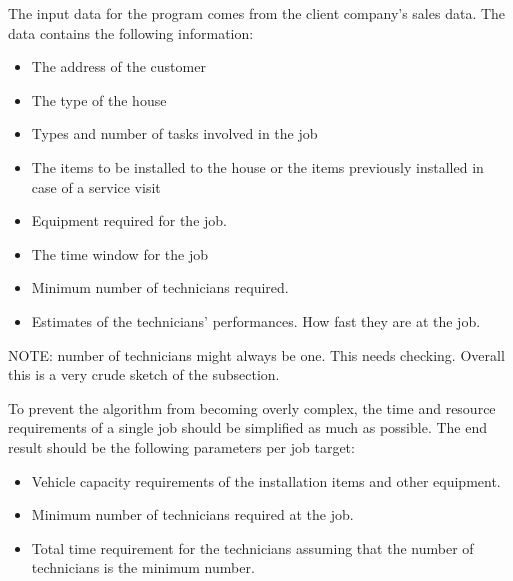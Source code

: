 The input data for the program comes from the client company's sales data. The data contains the following information:

\begin{itemize}
\item The address of the customer
\item The type of the house
\item Types and number of tasks involved in the job 
\item The items to be installed to the house or the items previously installed in case of a service visit
\item Equipment required for the job.
\item The time window for the job
\item Minimum number of technicians required.
\item Estimates of the technicians' performances. How fast they are at the job.
\end{itemize}

NOTE: number of technicians might always be one. This needs checking. Overall this is a very crude sketch of the subsection. 

To prevent the algorithm from becoming overly complex, the time and resource requirements of a single job should be simplified as much as possible. The end result should be the following parameters per job target:

\begin{itemize}
\item Vehicle capacity requirements of the installation items and other equipment.
\item Minimum number of technicians required at the job.
\item Total time requirement for the technicians assuming that the number of technicians is the minimum number.  
\end{itemize}